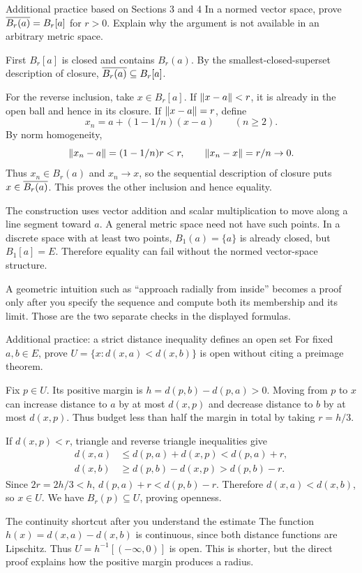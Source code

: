 \begin{exam}{Additional practice based on Sections 3 and 4}
In a normed vector space, prove $\overline{B_r(a)}=B_r[a]$ for $r>0$. Explain why the argument is not available in an arbitrary metric space.
\end{exam}
\begin{answer}
First $B_r[a]$ is closed and contains $B_r(a)$. By the smallest-closed-superset description of closure, $\overline{B_r(a)}\subseteq B_r[a]$.

For the reverse inclusion, take $x\in B_r[a]$. If $\left\lVert x-a\right\rVert<r$, it is already in the open ball and hence in its closure. If $\left\lVert x-a\right\rVert=r$, define
\[x_n=a+(1-1/n)(x-a)\qquad(n\ge2).\]
By norm homogeneity,
\[\left\lVert x_n-a\right\rVert=(1-1/n)r<r,\qquad \left\lVert x_n-x\right\rVert=r/n\to0.\]
Thus $x_n\in B_r(a)$ and $x_n\to x$, so the sequential description of closure puts $x\in\overline{B_r(a)}$. This proves the other inclusion and hence equality.

The construction uses vector addition and scalar multiplication to move along a line segment toward $a$. A general metric space need not have such points. In a discrete space with at least two points, $B_1(a)=\{a\}$ is already closed, but $B_1[a]=E$. Therefore equality can fail without the normed vector-space structure.
\end{answer}
\begin{tip}
A geometric intuition such as ``approach radially from inside'' becomes a proof only after you specify the sequence and compute both its membership and its limit. Those are the two separate checks in the displayed formulas.
\end{tip}


\begin{exam}{Additional practice: a strict distance inequality defines an open set}
For fixed $a,b\in E$, prove $U=\{x:d(x,a)<d(x,b)\}$ is open without citing a preimage theorem.
\end{exam}
\begin{answer}
Fix $p\in U$. Its positive margin is $h=d(p,b)-d(p,a)>0$. Moving from $p$ to $x$ can increase distance to $a$ by at most $d(x,p)$ and decrease distance to $b$ by at most $d(x,p)$. Thus budget less than half the margin in total by taking $r=h/3$.

If $d(x,p)<r$, triangle and reverse triangle inequalities give
\begin{align*}
d(x,a)&\le d(p,a)+d(x,p)<d(p,a)+r,\\
d(x,b)&\ge d(p,b)-d(x,p)>d(p,b)-r.
\end{align*}
Since $2r=2h/3<h$, $d(p,a)+r<d(p,b)-r$. Therefore $d(x,a)<d(x,b)$, so $x\in U$. We have $B_r(p)\subseteq U$, proving openness.
\end{answer}
\begin{method}{The continuity shortcut after you understand the estimate}
The function $h(x)=d(x,a)-d(x,b)$ is continuous, since both distance functions are Lipschitz. Thus $U=h^{-1}[(-\infty,0)]$ is open. This is shorter, but the direct proof explains how the positive margin produces a radius.
\end{method}


